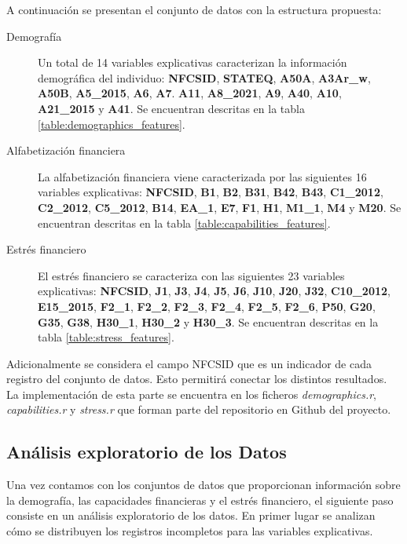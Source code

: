 \documentclass[a4paper, 11pt]{article}
\begin{document}
A continuación se presentan el conjunto de datos con la estructura propuesta:
\begin{description}
    \item[Demografía] Un total de 14 variables explicativas caracterizan la información demográfica del individuo: \textbf{NFCSID},
    \textbf{STATEQ}, \textbf{A50A}, \textbf{A3Ar\_w}, \textbf{A50B}, \textbf{A5\_2015}, \textbf{A6}, \textbf{A7}. \textbf{A11},
    \textbf{A8\_2021}, \textbf{A9}, \textbf{A40}, \textbf{A10}, \textbf{A21\_2015} y \textbf{A41}. Se encuentran descritas
    en la tabla \ref{table:demographics_features}.
    \item[Alfabetización financiera] La alfabetización financiera viene caracterizada por las siguientes 16 variables explicativas:
    \textbf{NFCSID}, \textbf{B1}, \textbf{B2}, \textbf{B31}, \textbf{B42}, \textbf{B43}, \textbf{C1\_2012}, \textbf{C2\_2012},
    \textbf{C5\_2012}, \textbf{B14}, \textbf{EA\_1}, \textbf{E7}, \textbf{F1}, \textbf{H1}, \textbf{M1\_1}, \textbf{M4} y
    \textbf{M20}. Se encuentran descritas en la tabla \ref{table:capabilities_features}.
    \item[Estrés financiero] El estrés financiero se caracteriza con las siguientes 23 variables explicativas: \textbf{NFCSID},
    \textbf{J1}, \textbf{J3}, \textbf{J4}, \textbf{J5}, \textbf{J6}, \textbf{J10}, \textbf{J20}, \textbf{J32}, \textbf{C10\_2012},
    \textbf{E15\_2015}, \textbf{F2\_1}, \textbf{F2\_2}, \textbf{F2\_3}, \textbf{F2\_4}, \textbf{F2\_5}, \textbf{F2\_6}, 
    \textbf{P50}, \textbf{G20}, \textbf{G35}, \textbf{G38}, \textbf{H30\_1}, \textbf{H30\_2} y \textbf{H30\_3}.
    Se encuentran descritas en la tabla \ref{table:stress_features}.
\end{description}

Adicionalmente se considera el campo NFCSID que es un indicador de cada registro
del conjunto de datos. Esto permitirá conectar los distintos resultados. La 
implementación de esta parte se encuentra en los ficheros \textit{demographics.r}, \textit{capabilities.r} y \textit{stress.r} que forman
parte del repositorio en Github del proyecto\cite{ALMO25}.

\subsection{Análisis exploratorio de los Datos}
\label{sec:exploratory_analysis}
Una vez contamos con los conjuntos de datos que proporcionan información sobre
la demografía, las capacidades financieras y el estrés financiero, el siguiente
paso consiste en un análisis exploratorio de los datos. En primer lugar se
analizan cómo se distribuyen los registros incompletos para las variables explicativas.
\end{document}
